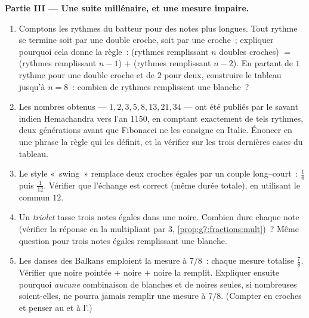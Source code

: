 \begin{problem}
\medskip
\noindent\textbf{Partie III --- Une suite millénaire, et une mesure
impaire.}
\begin{enumerate}[resume]
  \item Comptons les rythmes du batteur pour des notes plus
        longues. Tout rythme se termine soit par une double croche,
        soit par une croche~; expliquer pourquoi cela donne la
        règle~: (rythmes remplissant $n$ doubles croches) $=$
        (rythmes remplissant $n - 1$) $+$ (rythmes remplissant
        $n - 2$). En partant de $1$ rythme pour une double croche et
        de $2$ pour deux, construire le tableau jusqu'à $n = 8$~:
        combien de rythmes remplissent une blanche~?
  \item Les nombres obtenus --- $1, 2, 3, 5, 8, 13, 21, 34$ --- ont
        été publiés par le savant indien Hemachandra vers l'an
        1150, en comptant exactement de tels rythmes, deux
        générations avant que Fibonacci ne les consigne en Italie.
        Énoncer en une phrase la règle qui les définit, et la
        vérifier sur les trois dernières cases du tableau.
  \item Le style «~swing~» remplace deux croches égales par un
        couple long--court~: $\frac16$ puis $\frac{1}{12}$. Vérifier
        que l'échange est correct (même durée totale), en utilisant
        le  commun $12$.
  \item Un \emph{triolet} tasse trois notes égales dans une noire.
        Combien dure chaque note (vérifier la réponse en la
        multipliant par $3$, \cref{prop:g7:fractions:mult})~? Même
        question pour trois notes égales remplissant une blanche.
  \item Les danses des Balkans emploient la mesure à $7/8$~: chaque
        mesure totalise $\frac78$. Vérifier que noire pointée $+$
        noire $+$ noire la remplit. Expliquer ensuite pourquoi
        \emph{aucune} combinaison de blanches et de noires seules,
        si nombreuses soient-elles, ne pourra jamais remplir une
        mesure à $7/8$. (Compter en croches et penser au  et à
        l'.)
\end{enumerate}
\end{problem}
